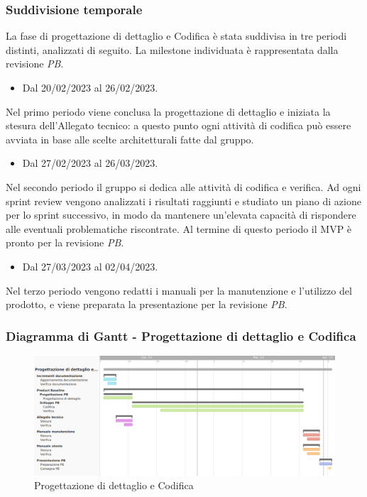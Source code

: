 \subsubsection{Suddivisione temporale}
La fase di progettazione di dettaglio e Codifica è stata suddivisa in tre periodi distinti, analizzati di seguito. La milestone individuata è rappresentata dalla revisione \textit{PB}.

\begin{itemize}
    \item Dal 20/02/2023 al 26/02/2023.
\end{itemize}
Nel primo periodo viene conclusa la progettazione di dettaglio e iniziata la stesura dell’Allegato tecnico: a questo punto ogni attività di codifica può essere avviata in base alle scelte architetturali fatte dal gruppo.

\begin{itemize}
    \item Dal 27/02/2023 al 26/03/2023.
\end{itemize}
Nel secondo periodo il gruppo si dedica alle attività di codifica e verifica. Ad ogni sprint review vengono analizzati i risultati raggiunti e studiato un piano di azione per lo sprint successivo, in modo da mantenere un’elevata capacità di rispondere alle eventuali problematiche riscontrate. Al termine di questo periodo il MVP è pronto per la revisione \textit{PB}.

\begin{itemize}
    \item Dal 27/03/2023 al 02/04/2023.
\end{itemize}
Nel terzo periodo vengono redatti i manuali per la manutenzione e l’utilizzo del prodotto, e viene preparata la presentazione per la revisione \textit{PB}.

\subsubsection{Diagramma di Gantt - Progettazione di dettaglio e Codifica}

\begin{figure}[H]
\centering
\includegraphics[width=\textwidth]{img/4_codifica.png}
\caption{Progettazione di dettaglio e Codifica}
\end{figure}

